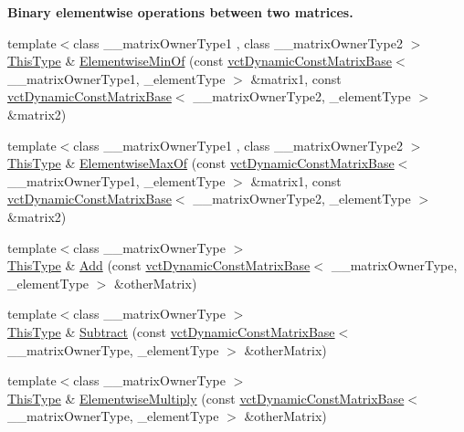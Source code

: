 \begin{Indent}{\bf Binary elementwise operations between two matrices.}
\begin{DoxyCompactItemize}
\item 
{\footnotesize template$<$class \+\_\+\+\_\+matrix\+Owner\+Type1 , class \+\_\+\+\_\+matrix\+Owner\+Type2 $>$ }\\\hyperlink{classvct_dynamic_const_matrix_base_ac4ff48cbe4d9de3fdef5a02447ffb9db}{This\+Type} \& \hyperlink{classvct_dynamic_matrix_base_a23b742730444699d26209e922b41478e}{Elementwise\+Min\+Of} (const \hyperlink{classvct_dynamic_const_matrix_base}{vct\+Dynamic\+Const\+Matrix\+Base}$<$ \+\_\+\+\_\+matrix\+Owner\+Type1, \+\_\+element\+Type $>$ \&matrix1, const \hyperlink{classvct_dynamic_const_matrix_base}{vct\+Dynamic\+Const\+Matrix\+Base}$<$ \+\_\+\+\_\+matrix\+Owner\+Type2, \+\_\+element\+Type $>$ \&matrix2)
\item 
{\footnotesize template$<$class \+\_\+\+\_\+matrix\+Owner\+Type1 , class \+\_\+\+\_\+matrix\+Owner\+Type2 $>$ }\\\hyperlink{classvct_dynamic_const_matrix_base_ac4ff48cbe4d9de3fdef5a02447ffb9db}{This\+Type} \& \hyperlink{classvct_dynamic_matrix_base_ab607f089d64a6f034400240370425d03}{Elementwise\+Max\+Of} (const \hyperlink{classvct_dynamic_const_matrix_base}{vct\+Dynamic\+Const\+Matrix\+Base}$<$ \+\_\+\+\_\+matrix\+Owner\+Type1, \+\_\+element\+Type $>$ \&matrix1, const \hyperlink{classvct_dynamic_const_matrix_base}{vct\+Dynamic\+Const\+Matrix\+Base}$<$ \+\_\+\+\_\+matrix\+Owner\+Type2, \+\_\+element\+Type $>$ \&matrix2)
\item 
{\footnotesize template$<$class \+\_\+\+\_\+matrix\+Owner\+Type $>$ }\\\hyperlink{classvct_dynamic_const_matrix_base_ac4ff48cbe4d9de3fdef5a02447ffb9db}{This\+Type} \& \hyperlink{classvct_dynamic_matrix_base_a44eea9ec4006fa9e9b8c8e85a8318c91}{Add} (const \hyperlink{classvct_dynamic_const_matrix_base}{vct\+Dynamic\+Const\+Matrix\+Base}$<$ \+\_\+\+\_\+matrix\+Owner\+Type, \+\_\+element\+Type $>$ \&other\+Matrix)
\item 
{\footnotesize template$<$class \+\_\+\+\_\+matrix\+Owner\+Type $>$ }\\\hyperlink{classvct_dynamic_const_matrix_base_ac4ff48cbe4d9de3fdef5a02447ffb9db}{This\+Type} \& \hyperlink{classvct_dynamic_matrix_base_af51cf2643c299d3b2508eb28b474ba74}{Subtract} (const \hyperlink{classvct_dynamic_const_matrix_base}{vct\+Dynamic\+Const\+Matrix\+Base}$<$ \+\_\+\+\_\+matrix\+Owner\+Type, \+\_\+element\+Type $>$ \&other\+Matrix)
\item 
{\footnotesize template$<$class \+\_\+\+\_\+matrix\+Owner\+Type $>$ }\\\hyperlink{classvct_dynamic_const_matrix_base_ac4ff48cbe4d9de3fdef5a02447ffb9db}{This\+Type} \& \hyperlink{classvct_dynamic_matrix_base_ae6607dc37f9a9b6a2800d1b5b451c9ac}{Elementwise\+Multiply} (const \hyperlink{classvct_dynamic_const_matrix_base}{vct\+Dynamic\+Const\+Matrix\+Base}$<$ \+\_\+\+\_\+matrix\+Owner\+Type, \+\_\+element\+Type $>$ \&other\+Matrix)

\end{DoxyCompactItemize}
\end{Indent}
